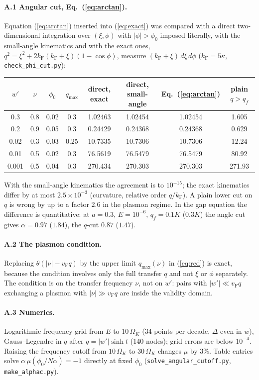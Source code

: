 \documentclass[11pt]{article}
\newcommand{\kF}{k_{\mathrm F}}
\newcommand{\vF}{v_{\mathrm F}}
\newcommand{\OK}{\Omega_K}
\begin{document}
\paragraph{A.1 Angular cut, Eq.~(\ref{eq:arctan}).}
Equation (\ref{eq:arctan}) inserted into (\ref{eq:exact}) was compared with a direct
two-dimensional integration over $(\xi,\phi)$ with $|\phi|>\phi_0$ imposed literally, with the
small-angle kinematics and with the exact ones, $q^2=\xi^2+2\kF(\kF+\xi)(1-\cos\phi)$,
measure $(\kF+\xi)\,d\xi\,d\phi$ ($\kF=5\kappa$, \texttt{check\_phi\_cut.py}):
\begin{center}\small
\begin{tabular}{cccc|cccc}
\toprule
$w'$ & $\nu$ & $\phi_0$ & $q_{\max}$ & direct, exact & direct, small-angle & Eq.~(\ref{eq:arctan}) & plain $q>q_f$\\
\midrule
0.3 & 0.8 & 0.02 & 0.3 & 1.02463 & 1.02454 & 1.02454 & 1.605\\
0.2 & 0.9 & 0.05 & 0.3 & 0.24429 & 0.24368 & 0.24368 & 0.629\\
0.02 & 0.3 & 0.03 & 0.25 & 10.7335 & 10.7306 & 10.7306 & 12.24\\
0.01 & 0.5 & 0.02 & 0.3 & 76.5619 & 76.5479 & 76.5479 & 80.92\\
0.001 & 0.5 & 0.04 & 0.3 & 270.434 & 270.303 & 270.303 & 271.93\\
\bottomrule
\end{tabular}\normalsize
\end{center}
With the small-angle kinematics the agreement is to $10^{-15}$; the exact kinematics differ by
at most $2.5\times10^{-3}$ (curvature, relative order $q/\kF$). A plain lower cut on $q$
is wrong by up to a factor $2.6$ in the plasmon regime. In the gap equation the difference is
quantitative: at $a=0.3$, $E=10^{-6}$, $q_f=0.1K$ ($0.3K$) the angle cut gives
$\alpha=0.97$ ($1.84$), the $q$-cut $0.87$ ($1.47$).

\paragraph{A.2 The plasmon condition.}
Replacing $\theta(|\nu|-\vF q)$ by the upper limit $q_{\max}(\nu)$ in (\ref{eq:red}) is exact,
because the condition involves only the full transfer $q$ and not $\xi$ or $\phi$ separately. The condition is on the
transfer frequency $\nu$, not on $w'$: pairs with $|w'|\ll\vF q$ exchanging a plasmon with
$|\nu|\gg\vF q$ are inside the validity domain.

\paragraph{A.3 Numerics.}
Logarithmic frequency grid from $E$ to $10\,\OK$ ($34$ points per decade, $\Delta$ even in
$w$), Gauss--Legendre in $q$ after $q=|w'|\sinh t$ (140 nodes); grid errors are below
$10^{-4}$. Raising the frequency cutoff from $10\,\OK$ to $30\,\OK$ changes $\mu$ by $3\%$.
Table entries solve $\alpha\,\mu(\phi_0/N\alpha)=-1$ directly at fixed $\phi_0$
(\texttt{solve\_angular\_cutoff.py}, \texttt{make\_alphac.py}).
\end{document}
